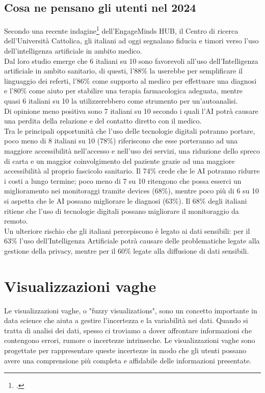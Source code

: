 \subsection{Cosa ne pensano gli utenti nel 2024}
Secondo una recente indagine\footcite{womak:intelligenza-artificiale-e-medicina} dell'EngageMinds HUB, il Centro di ricerca dell'Università Cattolica, gli italiani ad oggi segnalano fiducia e timori verso l'uso dell'intelligenza artificiale in ambito medico.\\
Dal loro studio emerge che 6 italiani su 10 sono favorevoli all'uso dell'Intelligenza artificiale in ambito sanitario, di questi, l'88\% la userebbe per semplificare il linguaggio dei referti, l'86\% come supporto al medico per effettuare una diagnosi e l'80\% come aiuto per stabilire una terapia farmacologica adeguata, mentre quasi 6 italiani su 10 la utilizzerebbero come strumento per un'autoanalisi.\\
Di opinione meno positiva sono 7 italiani su 10 secondo i quali l'AI potrà causare una perdita della relazione e del contatto diretto con il medico.\\

Tra le principali opportunità che l'uso delle tecnologie digitali potranno portare, poco meno di 8 italiani su 10 (78\%) riferiscono che esse porteranno ad una maggiore accessibilità nell'accesso e nell'uso dei servizi, una riduzione dello spreco di carta e un maggior coinvolgimento del paziente grazie ad una maggiore accessibilità al proprio fascicolo sanitario. Il 74\% crede che le AI potranno ridurre i costi a lungo termine; poco meno di 7 su 10 ritengono che possa esserci un miglioramento nei monitoraggi tramite devices (68\%), mentre poco più di 6 su 10 si aspetta che le AI possano migliorare le diagnosi (63\%). Il 68\% degli italiani ritiene che l'uso di tecnologie digitali possano migliorare il monitoraggio da
remoto.\\

Un ulteriore rischio che gli italiani percepiscono è legato ai dati sensibili: per il 63\% l'uso dell'Intelligenza Artificiale potrà causare delle problematiche legate alla gestione della privacy, mentre per il 60\% legate alla diffusione di dati sensibili.


\section{Visualizzazioni vaghe}
Le visualizzazioni vaghe, o "fuzzy visualizations", sono un concetto importante in data science che aiuta a gestire l'incertezza e la variabilità nei dati. Quando si tratta di analisi dei dati, spesso ci troviamo a dover affrontare informazioni che contengono errori, rumore o incertezze intrinseche. Le visualizzazioni vaghe sono progettate per rappresentare queste incertezze in modo che gli utenti possano avere una comprensione più completa e affidabile delle informazioni presentate.\\

